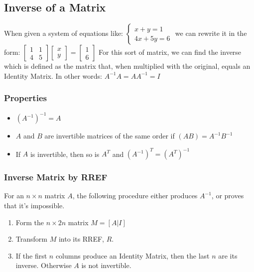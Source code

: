 \documentclass[12pt,landscape,twocolumn]{article}
\begin{document}
    \subsection{Inverse of a Matrix}
    When given a system of equations like:
    $
        \begin{cases}
            x + y = 1\\
            4x + 5y = 6
        \end{cases}
    $
    we can rewrite it in the form:
    $
        \left[\begin{array}{cc}
        1 & 1\\
        4 & 5
        \end{array}\right]
        \left[\begin{array}{c}
            x\\
            y
        \end{array}\right] =
        \left[\begin{array}{c}
            1\\
            6
        \end{array}\right]
    $
    For this sort of matrix, we can find the inverse which is defined as the matrix that, when multiplied with the original, equals an Identity Matrix. In other words:
    $ A^{-1}A = AA^{-1} = I $

        \subsubsection{Properties}
        \begin{itemize}
        \item ${( A^{-1})}^{-1} = A$
        \item $A$ and $B$ are invertible matrices of the same order if $\left(AB\right) = A^{-1}B^{-1}$
        \item If $A$ is invertible, then so is $A^T$ and $\left(A^{-1}\right)^T = \left(A^T\right)^{-1}$
        \end{itemize}

        \subsubsection{Inverse Matrix by RREF}
        For an $n\times n$ matrix $A$, the following procedure either produces $A^{-1}$, or proves that it's impossible.

        \begin{enumerate}
        \item Form the $n \times 2n$ matrix $M=\left[A|I\right]$
        \item Transform $M$ into its RREF, $R$.
        \item If the first $n$ columns produce an Identity Matrix, then the last $n$ are its inverse. Otherwise $A$ is not invertible.
        \end{enumerate}
\end{document}
